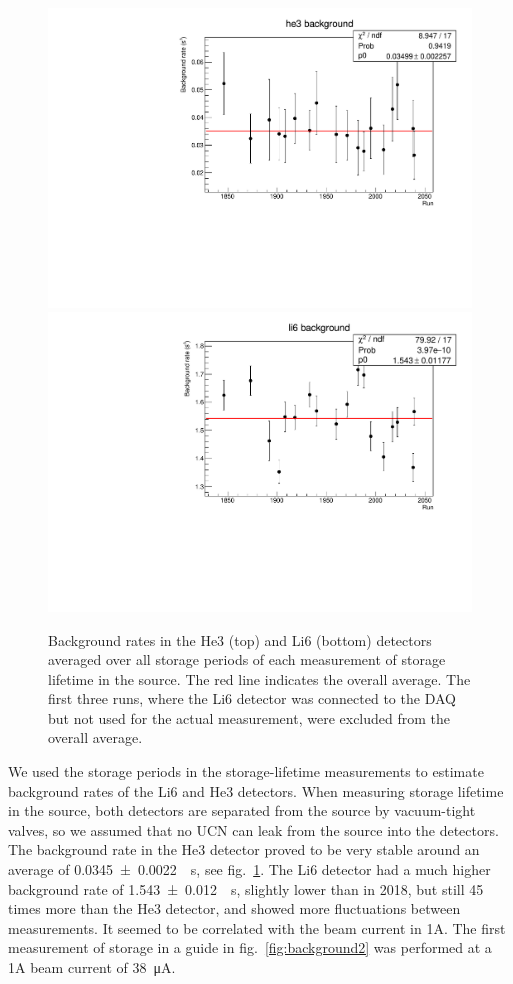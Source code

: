 \documentclass[10pt,letterpaper]{article}
\begin{document}
\begin{figure}
\centering
\includegraphics[width=\textwidth]{../storagelifetime/he3_background.pdf}
\includegraphics[width=\textwidth]{../storagelifetime/li6_background.pdf}
\caption{Background rates in the He3 (top) and Li6 (bottom) detectors averaged over all storage periods of each measurement of storage lifetime in the source. The red line indicates the overall average. The first three runs, where the Li6 detector was connected to the DAQ but not used for the actual measurement, were excluded from the overall average.}
\label{fig:background1}
\end{figure}

We used the storage periods in the storage-lifetime measurements to estimate background rates of the Li6 and He3 detectors. When measuring storage lifetime in the source, both detectors are separated from the source by vacuum-tight valves, so we assumed that no UCN can leak from the source into the detectors. The background rate in the He3 detector proved to be very stable around an average of \SI{0.0345 +- 0.0022}{\per\second}, see fig.~\ref{fig:background1}. The Li6 detector had a much higher background rate of \SI{1.543 +- 0.012}{\per\second}, slightly lower than in 2018, but still 45 times more than the He3 detector, and showed more fluctuations between measurements. It seemed to be correlated with the beam current in 1A. The first measurement of storage in a guide in fig.~\ref{fig:background2} was performed at a 1A beam current of \SI{38}{\micro\ampere}.
\end{document}
